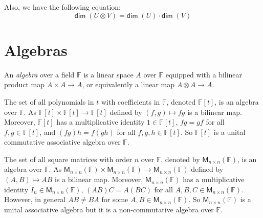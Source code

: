 \documentclass[
	11pt, %
	fleqn, %
	a4paper, %
]{LegrandOrangeBook}
\newcommand{\F}{\mathbb{F}} %
\newcommand{\M}[2]{\mathsf{M}_{#1}(#2)} %
\renewcommand{\dim}{\mathsf{dim\;}} %
\newcommand{\vequiv}{\rotatebox{90}{$\equiv$}}
\begin{document}
\begin{center}
    \qquad
\end{center}

Also, we have the following equation:
\[
    \dim(U \otimes V) = \dim(U) \cdot \dim(V)
\]

\newpage

\section{Algebras}

\begin{definition}[Algebras]
    An \emph{algebra} over a field $\F$ is a linear space $A$ over $\F$ equipped with a bilinear product map $A \times A \to A$, or equivalently a linear map $A \otimes A \to A$.
\end{definition}

\begin{example}
    The set of all polynomials in $t$ with coefficients in $\F$, denoted $\F[t]$, is an algebra over $\F$. As $\F[t] \times \F[t] \to \F[t]$ defined by $(f, g) \mapsto fg$ is a bilinear map. Moreover, $\F[t]$ has a multiplicative identity $1 \in \F[t]$, $fg = gf$ for all $f, g \in \F[t]$, and $(fg)h = f(gh)$ for all $f, g, h \in \F[t]$. So $\F[t]$ is a unital commutative associative algebra over $\F$.
\end{example}

\begin{example}
    The set of all square matrices with order $n$ over $\F$, denoted by $\M{n \times n}{\F}$, is an algebra over $\F$. As $\M{n \times n}{\F} \times \M{n \times n}{\F} \to \M{n \times n}{\F}$ defined by $(A, B) \mapsto AB$ is a bilinear map. Moreover, $\M{n \times n}{\F}$ has a multiplicative identity $I_n \in \M{n \times n}{\F}$, $(AB)C = A(BC)$ for all $A, B, C \in \M{n \times n}{\F}$. However, in general $AB \neq BA$ for some $A, B \in \M{n \times n}{\F}$. So $\M{n \times n}{\F}$ is a unital associative algebra but it is a non-commutative algebra over $\F$.
\end{example}
\end{document}
